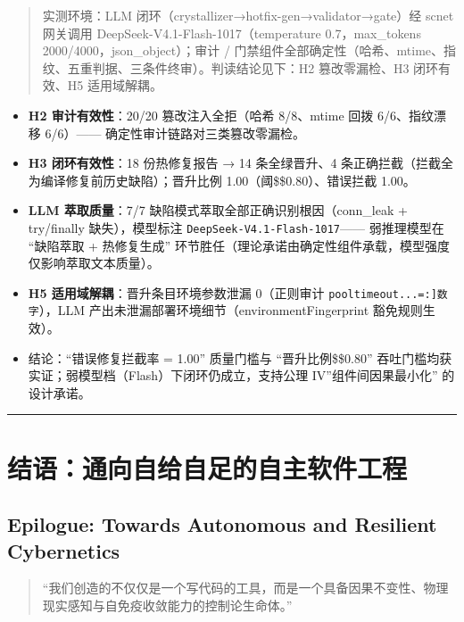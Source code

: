 \begin{quote}
实测环境：LLM 闭环（crystallizer→hotfix-gen→validator→gate）经 scnet
网关调用 DeepSeek-V4.1-Flash-1017（temperature 0.7，max\_tokens
2000/4000，json\_object）；审计 /
门禁组件全部确定性（哈希、mtime、指纹、五重判据、三条件终审）。判读结论见下：H2
篡改零漏检、H3 闭环有效、H5 适用域解耦。
\end{quote}

\begin{itemize}
\item
  \textbf{H2 审计有效性}：20/20 篡改注入全拒（哈希 8/8、mtime 回拨
  6/6、指纹漂移 6/6）------ 确定性审计链路对三类篡改零漏检。
\item
  \textbf{H3 闭环有效性}：18 份热修复报告 → 14 条全绿晋升、4
  条正确拦截（拦截全为编译修复前历史缺陷）；晋升比例
  1.00（阈\$\ge\$0.80）、错误拦截 1.00。
\item
  \textbf{LLM 萃取质量}：7/7 缺陷模式萃取全部正确识别根因（conn\_leak +
  try/finally 缺失），模型标注 \texttt{DeepSeek-V4.1-Flash-1017}------
  弱推理模型在 ``缺陷萃取 + 热修复生成''
  环节胜任（理论承诺由确定性组件承载，模型强度仅影响萃取文本质量）。
\item
  \textbf{H5 适用域解耦}：晋升条目环境参数泄漏 0（正则审计
  \texttt{pool\textbar{}timeout\textbar{}...\textbar{}{[}=:{]}数字}），LLM
  产出未泄漏部署环境细节（environmentFingerprint 豁免规则生效）。
\item
  结论：``错误修复拦截率 = 1.00'' 质量门槛与 ``晋升比例\$\ge\$0.80''
  吞吐门槛均获实证；弱模型档（Flash）下闭环仍成立，支持公理
  IV''组件间因果最小化'' 的设计承诺。
\end{itemize}

\begin{center}\rule{0.5\linewidth}{0.5pt}\end{center}

\section{结语：通向自给自足的自主软件工程}\label{ux7ed3ux8bedux901aux5411ux81eaux7ed9ux81eaux8db3ux7684ux81eaux4e3bux8f6fux4ef6ux5de5ux7a0b}

\subsection{Epilogue: Towards Autonomous and Resilient
Cybernetics}\label{epilogue-towards-autonomous-and-resilient-cybernetics}

\begin{quote}
``我们创造的不仅仅是一个写代码的工具，而是一个具备因果不变性、物理现实感知与自免疫收敛能力的控制论生命体。''
\end{quote}

